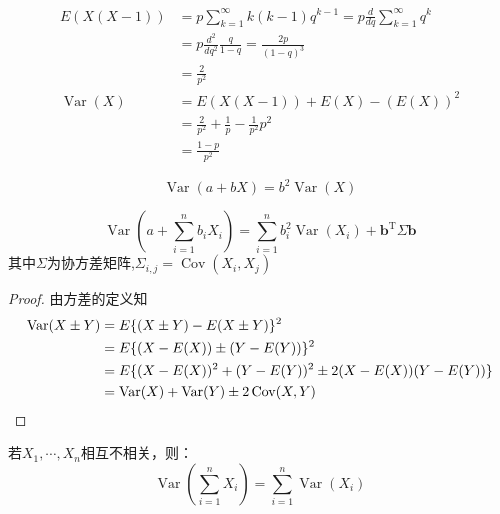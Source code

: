 \begin{example}[微分法求解几何分布方差]\label{ex:geometric_dist_var}
    \begin{align*}
        E(X(X-1))             & =p\sum_{k=1}^{\infty}k(k-1) q^{k-1}=p\frac{d}{d q}\sum_{k=1}^{\infty} q^{k} \\
                              & =p\frac{d^2}{d q^2} \frac{q}{1-q} =\frac{2p}{(1-q)^{3}}                     \\
                              & =\frac{2}{p^2}                                                              \\
        \operatorname{Var}(X) & =  E(X(X-1)) + E(X) -(E(X))^2                                               \\
                              & = \frac{2}{p^2} + \frac{1}{p} -\frac{1}{p^2} p^2                            \\
                              & = \frac{1-p}{p^2}
    \end{align*}
\end{example}

\begin{proposition}
    \[ \operatorname{Var}(a+bX)=b^2\operatorname{Var}(X) \]
\end{proposition}

\begin{proposition}
    \[ \operatorname{Var}(a+\sum_{i=1}^n b_i X_i)=\sum_{i=1}^n b_i^2 \operatorname{Var}(X_i)+\mathbf{b}^{\mathrm{T}} \Sigma \mathbf{b}\]
    其中$\Sigma$为协方差矩阵,$\Sigma_{i,j}=\operatorname{Cov}(X_i,X_j)$
\end{proposition}
\begin{proof}
    由方差的定义知
    \begin{align*}
        \operatorname{Var}(X \pm Y) & =E\{(X \pm Y)-E(X \pm Y)\}^2                      \\
                      & =E\{(X-E(X)) \pm(Y-E(Y))\}^2                      \\
                      & =E\{(X-E(X))^2+(Y-E(Y))^2 \pm 2(X-E(X))(Y-E(Y))\} \\
                      & =\operatorname{Var}(X)+\operatorname{Var}(Y) \pm 2 \operatorname{Cov}(X, Y)
    \end{align*}
\end{proof}

\begin{corollary}
    若$X_1,\cdots ,X_n$相互不相关，则：
    \[ \operatorname{Var}(\sum_{i=1}^n X_i)=\sum_{i=1}^n\operatorname{Var}(X_i) \]
\end{corollary}

